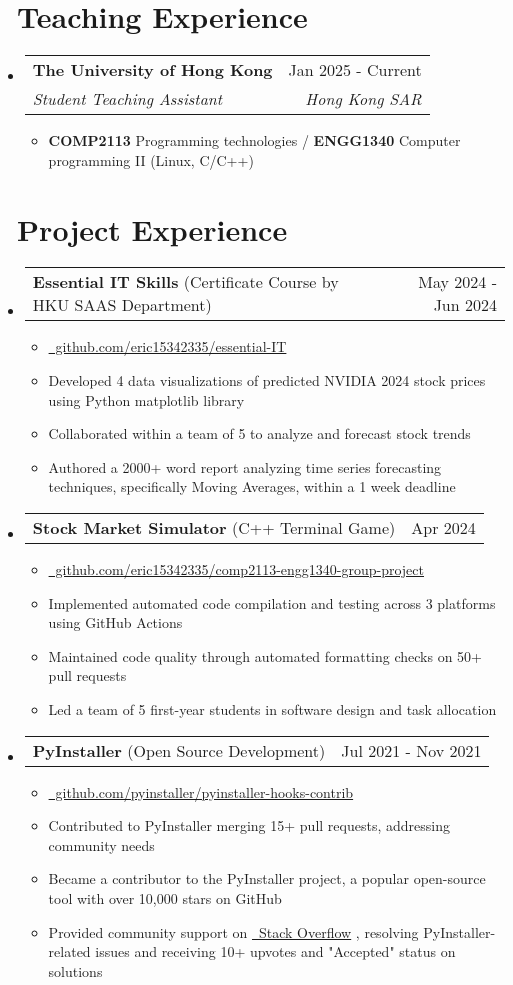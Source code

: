 \documentclass[a4paper,11pt]{article}
\makeatletter
\newcommand{\iconlink}[3]{
  \href{#2}{#1~#3}
}
\newcommand{\iconsection}[2]{
  \section[#2]{#1~#2}
}
\newcommand{\resumeItem}[1]{
  \item\small{
    {#1 \vspace{-2pt}}
  }
}
\newcommand{\resumeSubheading}[4]{
  \vspace{-2pt}\item
    \begin{tabular*}{0.97\textwidth}[t]{l@{\extracolsep{\fill}}r}
      \textbf{#1} & #2 \\
      \textit{\small#3} & \textit{\small #4} \\
    \end{tabular*}\vspace{-7pt}
}
\newcommand{\resumeProjectHeading}[2]{
    \item
    \begin{tabular*}{0.97\textwidth}{l@{\extracolsep{\fill}}r}
      \small#1 & #2 \\
    \end{tabular*}\vspace{-7pt}
}
\newcommand{\resumeSubHeadingListStart}{\begin{itemize}[leftmargin=0.15in, label={}]}
\newcommand{\resumeSubHeadingListEnd}{\end{itemize}}
\newcommand{\resumeItemListStart}{\begin{itemize}}
\newcommand{\resumeItemListEnd}{\end{itemize}\vspace{-5pt}}
\makeatother
\begin{document}
\iconsection{\faChalkboardTeacher}{Teaching Experience}
  \resumeSubHeadingListStart
    \resumeSubheading
      {The University of Hong Kong}{Jan 2025 - Current}
      {Student Teaching Assistant}{Hong Kong SAR}
      \resumeItemListStart
        \resumeItem{\textbf{COMP2113} Programming technologies / \textbf{ENGG1340} Computer programming II (Linux, C/C++)}
      \resumeItemListEnd
  \resumeSubHeadingListEnd

\iconsection{\faLaptopCode}{Project Experience}
  \resumeSubHeadingListStart
    \resumeProjectHeading
      {\textbf{Essential IT Skills} (Certificate Course by HKU SAAS Department)}{May 2024 - Jun 2024}
      \resumeItemListStart
        \resumeItem{\iconlink{\faGithub}{https://github.com/eric15342335/essential-IT}{github.com/eric15342335/essential-IT}}
        \resumeItem{Developed 4 data visualizations of predicted NVIDIA 2024 stock prices using Python matplotlib library}
        \resumeItem{Collaborated within a team of 5 to analyze and forecast stock trends}
        \resumeItem{Authored a 2000+ word report analyzing time series forecasting techniques, specifically Moving Averages, within a 1 week deadline}
      \resumeItemListEnd
    \resumeProjectHeading
      {\textbf{Stock Market Simulator} (C++ Terminal Game)}{Apr 2024}
      \resumeItemListStart
        \resumeItem{\iconlink{\faGithub}{https://github.com/eric15342335/comp2113-engg1340-group-project}{github.com/eric15342335/comp2113-engg1340-group-project}}
        \resumeItem{Implemented automated code compilation and testing across 3 platforms using GitHub Actions}
        \resumeItem{Maintained code quality through automated formatting checks on 50+ pull requests}
        \resumeItem{Led a team of 5 first-year students in software design and task allocation}
      \resumeItemListEnd
    \resumeProjectHeading
      {\textbf{PyInstaller} (Open Source Development)}{Jul 2021 - Nov 2021}
      \resumeItemListStart
        \resumeItem{\iconlink{\faGithub}{https://github.com/pyinstaller/pyinstaller-hooks-contrib}{github.com/pyinstaller/pyinstaller-hooks-contrib}}
        \resumeItem{Contributed to PyInstaller merging 15+ pull requests, addressing community needs}
        \resumeItem{Became a contributor to the PyInstaller project, a popular open-source tool with over 10,000 stars on GitHub}
        \resumeItem{Provided community support on \iconlink{\faStackOverflow}{https://stackoverflow.com/}{Stack Overflow}, resolving PyInstaller-related issues and receiving 10+ upvotes and "Accepted" status on solutions}
      \resumeItemListEnd
  \resumeSubHeadingListEnd
\end{document}
